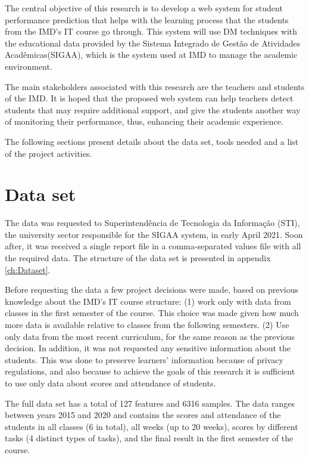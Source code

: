 The central objective of this research is to develop a web system for student performance prediction that helps with the learning process that the students from the IMD's IT course go through. This system will use DM techniques with the educational data provided by the Sistema Integrado de Gestão de Atividades Acadêmicas(SIGAA), which is the system used at IMD to manage the academic environment.

The main stakeholders associated with this research are the teachers and students of the IMD. It is hoped that the proposed web system can help teachers detect students that may require additional support, and give the students another way of monitoring their performance, thus, enhancing their academic experience.

The following sections present details about the data set, tools needed and a list of the project activities.

\section{Data set}

The data was requested to Superintendência de Tecnologia da Informação (STI), the university sector responsible for the SIGAA system, in early April 2021. Soon after, it was received a single report file in a comma-separated values file with all the required data. The structure of the data set is presented in appendix \ref{ch:Dataset}.

Before requesting the data a few project decisions were made, based on previous knowledge about the IMD's IT course structure: (1) work only with data from classes in the first semester of the course. This choice was made given how much more data is available relative to classes from the following semesters. (2) Use only data from the most recent curriculum, for the same reason as the previous decision. In addition, it was not requested any sensitive information about the students. This was done to preserve learners' information because of privacy regulations, and also because to achieve the goals of this research it is sufficient to use only data about scores and attendance of students.

The full data set has a total of 127 features and 6316 samples. The data ranges between years 2015 and 2020 and contains the scores and attendance of the students in all classes (6 in total), all weeks (up to 20 weeks), scores by different tasks (4 distinct types of tasks), and the final result in the first semester of the course.

